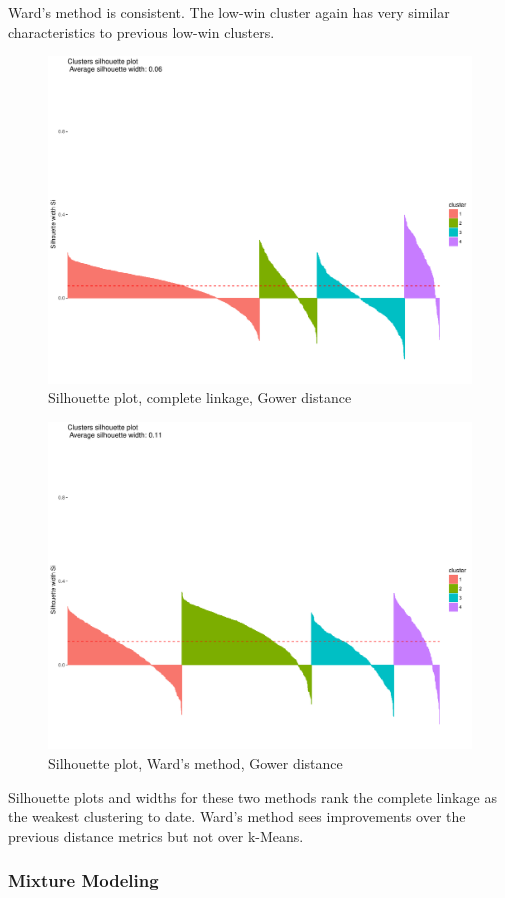 \documentclass[10pt,a4paper, hidelinks]{article} %
\begin{document}
Ward's method is consistent.  The low-win cluster again has very similar characteristics to previous low-win clusters.

\begin{figure}[H]
	\centering
	\includegraphics[width=0.7\linewidth]{"../fig/compsil3"}
	\caption{Silhouette plot, complete linkage, Gower distance}
\end{figure}

\begin{figure}[H]
	\centering
	\includegraphics[width=0.7\linewidth]{"../fig/wardsil3"}
	\caption{Silhouette plot, Ward's method, Gower distance}
\end{figure}

Silhouette plots and widths for these two methods rank the complete linkage as the weakest clustering to date.  Ward's method sees improvements over the previous distance metrics but not over k-Means.

\subsubsection{Mixture Modeling}

\end{document}
